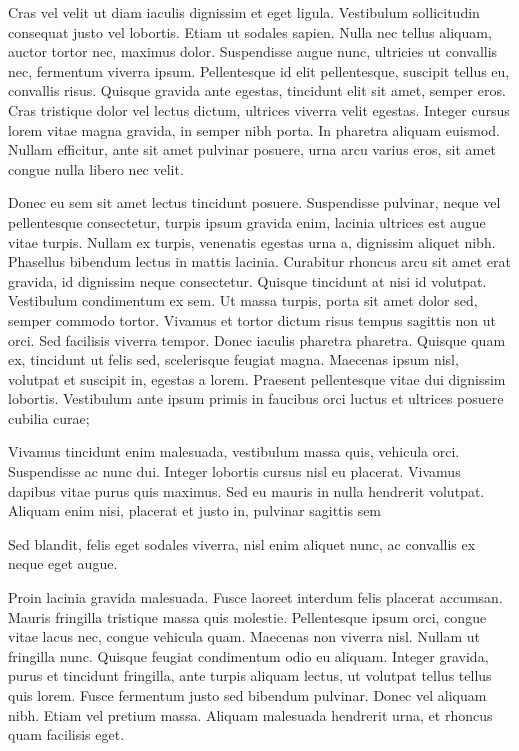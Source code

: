 \documentclass[12pt]{journalrebuttal}
\begin{document}
\nextreviewer
\begin{revcomment}
Cras vel velit ut diam iaculis dignissim et eget ligula. Vestibulum sollicitudin consequat justo vel lobortis. Etiam ut sodales sapien. Nulla nec tellus aliquam, auctor tortor nec, maximus dolor. Suspendisse augue nunc, ultricies ut convallis nec, fermentum viverra ipsum. Pellentesque id elit pellentesque, suscipit tellus eu, convallis risus. Quisque gravida ante egestas, tincidunt elit sit amet, semper eros. Cras tristique dolor vel lectus dictum, ultrices viverra velit egestas. Integer cursus lorem vitae magna gravida, in semper nibh porta. In pharetra aliquam euismod. Nullam efficitur, ante sit amet pulvinar posuere, urna arcu varius eros, sit amet congue nulla libero nec velit.

Donec eu sem sit amet lectus tincidunt posuere. Suspendisse pulvinar, neque vel pellentesque consectetur, turpis ipsum gravida enim, lacinia ultrices est augue vitae turpis. Nullam ex turpis, venenatis egestas urna a, dignissim aliquet nibh. Phasellus bibendum lectus in mattis lacinia. Curabitur rhoncus arcu sit amet erat gravida, id dignissim neque consectetur. Quisque tincidunt at nisi id volutpat. Vestibulum condimentum ex sem. Ut massa turpis, porta sit amet dolor sed, semper commodo tortor. Vivamus et tortor dictum risus tempus sagittis non ut orci. Sed facilisis viverra tempor. Donec iaculis pharetra pharetra. Quisque quam ex, tincidunt ut felis sed, scelerisque feugiat magna. Maecenas ipsum nisl, volutpat et suscipit in, egestas a lorem. Praesent pellentesque vitae dui dignissim lobortis. Vestibulum ante ipsum primis in faucibus orci luctus et ultrices posuere cubilia curae;
\end{revcomment}
\begin{response}
Vivamus tincidunt enim malesuada, vestibulum massa quis, vehicula orci. Suspendisse ac nunc dui. Integer lobortis cursus nisl eu placerat. Vivamus dapibus vitae purus quis maximus. Sed eu mauris in nulla hendrerit volutpat. Aliquam enim nisi, placerat et justo in, pulvinar sagittis sem
\end{response}

\begin{revcomment}
Sed blandit, felis eget sodales viverra, nisl enim aliquet nunc, ac convallis ex neque eget augue.
\end{revcomment}
\begin{response}
Proin lacinia gravida malesuada. Fusce laoreet interdum felis placerat accumsan. Mauris fringilla tristique massa quis molestie. Pellentesque ipsum orci, congue vitae lacus nec, congue vehicula quam. Maecenas non viverra nisl. Nullam ut fringilla nunc. Quisque feugiat condimentum odio eu aliquam. Integer gravida, purus et tincidunt fringilla, ante turpis aliquam lectus, ut volutpat tellus tellus quis lorem. Fusce fermentum justo sed bibendum pulvinar. Donec vel aliquam nibh. Etiam vel pretium massa. Aliquam malesuada hendrerit urna, et rhoncus quam facilisis eget.
\end{response}
\end{document}

